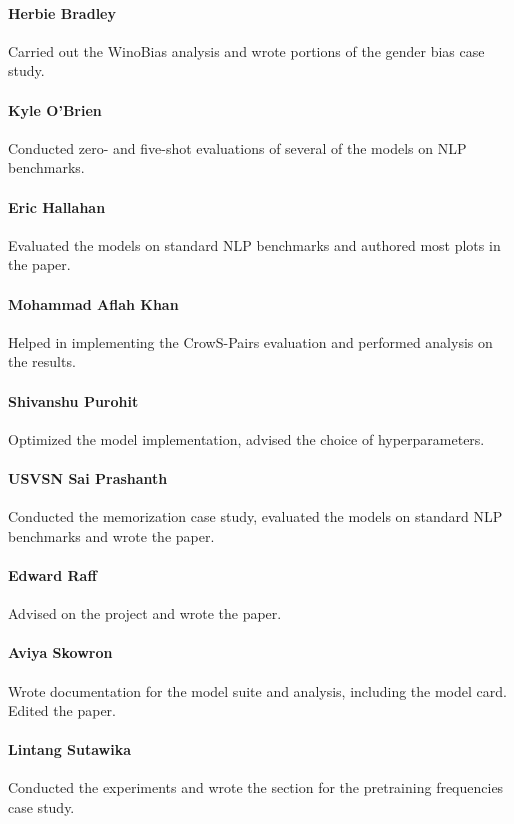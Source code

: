 \documentclass{article}
\theoremstyle{plain}
\theoremstyle{definition}
\theoremstyle{remark}
\begin{document}
\paragraph{Herbie Bradley} Carried out the WinoBias analysis and wrote portions of the gender bias case study.

\paragraph{Kyle O'Brien} Conducted zero- and five-shot evaluations of several of the models on NLP benchmarks.

\paragraph{Eric Hallahan} Evaluated the models on standard NLP benchmarks and authored most plots in the paper.

\paragraph{Mohammad Aflah Khan} Helped in implementing the CrowS-Pairs evaluation and performed analysis on the results.

\paragraph{Shivanshu Purohit} Optimized the model implementation, advised the choice of hyperparameters.

\paragraph{USVSN Sai Prashanth} Conducted the memorization case study, evaluated the models on standard NLP benchmarks and wrote the paper.

\paragraph{Edward Raff} Advised on the project and wrote the paper.

\paragraph{Aviya Skowron} Wrote documentation for the model suite and analysis, including the model card. Edited the paper.

\paragraph{Lintang Sutawika} Conducted the experiments and wrote the section for the pretraining frequencies case study.
\end{document}
